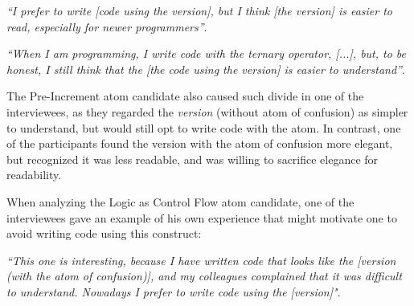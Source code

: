 \begin{mq}
\emph{``I prefer to write [code using the \lhs version], but I think [the \rhs version] is easier to read, especially for newer programmers''}.
\end{mq}

\begin{mq}
\emph{``When I am programming, I write code with the ternary operator, [...], but, to be honest, I still think that the 
[the code using the \lhs version] 
is easier to understand''}.
\end{mq}



The Pre-Increment atom candidate also caused such
divide in one of the interviewees, as they
regarded the \emph{\rhs version} (without atom of confusion)
as simpler to understand, but would still opt to write
code with the atom. In contrast, %
one of the participants found the 
version with the atom of confusion more elegant,
but recognized it was less readable,
and was willing to sacrifice elegance for readability.


When analyzing the Logic as Control Flow atom candidate, one of
the interviewees gave an example of his own experience
that might motivate one to avoid writing code using this construct:

\begin{mq}
  \emph{``This one is interesting, because I have written
  code that looks like the [\lhs version (with the atom of confusion)],
  and my colleagues complained that it was difficult to understand.
  Nowadays I prefer to write code using the [\rhs version]"}.
\end{mq}

